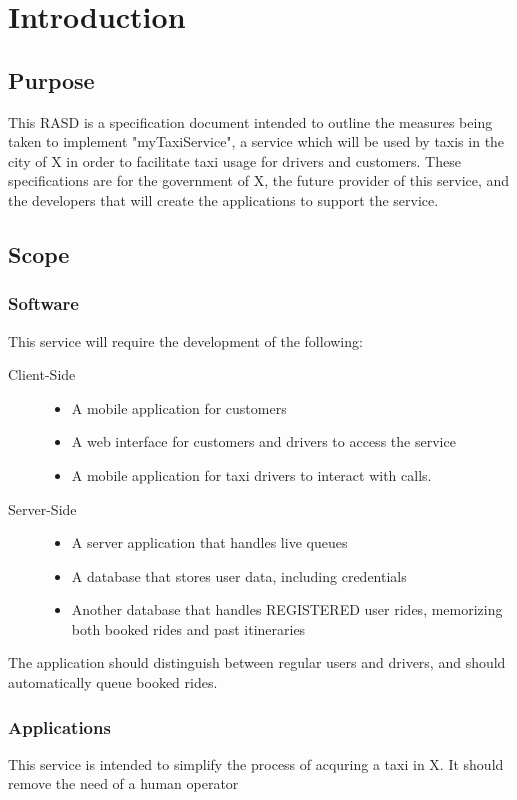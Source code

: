 \section{Introduction}

\subsection{Purpose}
	This RASD is a specification document intended to outline the measures being taken to implement "myTaxiService", a service which will be used
	by taxis in the city of X in order to facilitate taxi usage for drivers and customers. These specifications are for the government of X, the
	future provider of this service, and the developers that will create the applications to support the service.
\subsection{Scope}
	\subsubsection{Software}
		This service will require the development of the following:
		\begin{description}
			\item[Client-Side] \hfill
				\begin{itemize}
					\item A mobile application for customers
					\item A web interface for customers and drivers to access the service
					\item A mobile application for taxi drivers to interact with calls.
				\end{itemize}
			\item[Server-Side] \hfill
				\begin{itemize}
					\item A server application that handles live queues
					\item A database that stores user data, including credentials
					\item Another database that handles REGISTERED user rides, memorizing both booked rides and past itineraries
				\end{itemize}
		\end{description}
		The application should distinguish between regular users and drivers, and should automatically queue booked rides.
	\subsubsection{Applications} %
		This service is intended to simplify the process of acquring a taxi in X. It should remove the need of a human operator
